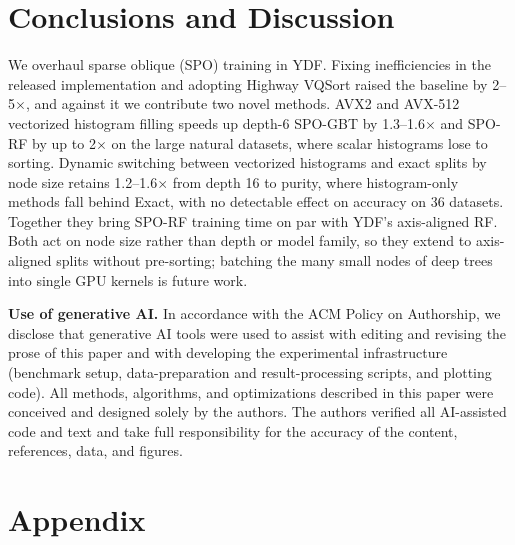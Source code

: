 \documentclass[sigconf,anonymous,review]{acmart}
\begin{document}
% 




\section{Conclusions and Discussion}

We overhaul sparse oblique (SPO) training in YDF. Fixing inefficiencies in the released implementation and adopting Highway VQSort raised the baseline by 2--5$\times$, and against it we contribute two novel methods. AVX2 and AVX-512 vectorized histogram filling speeds up depth-6 SPO-GBT by 1.3--1.6$\times$ and SPO-RF by up to 2$\times$ on the large natural datasets, where scalar histograms lose to sorting. Dynamic switching between vectorized histograms and exact splits by node size retains 1.2--1.6$\times$ from depth 16 to purity, where histogram-only methods fall behind Exact, with no detectable effect on accuracy on 36 datasets. Together they bring SPO-RF training time on par with YDF's axis-aligned RF. Both act on node size rather than depth or model family, so they extend to axis-aligned splits without pre-sorting; batching the many small nodes of deep trees into single GPU kernels is future work.

\begin{acks}
\textbf{Use of generative AI.} In accordance with the ACM Policy on Authorship,
we disclose that generative AI tools were used to assist with
editing and revising the prose of this paper and with developing the
experimental infrastructure (benchmark setup, data-preparation and
result-processing scripts, and plotting code). All methods, algorithms, and
optimizations described in this paper were conceived and designed solely by the
authors. The authors verified all AI-assisted code and text and take full
responsibility for the accuracy of the content, references, data, and figures.
\end{acks}




\appendix

\section{Appendix}
\end{document}
